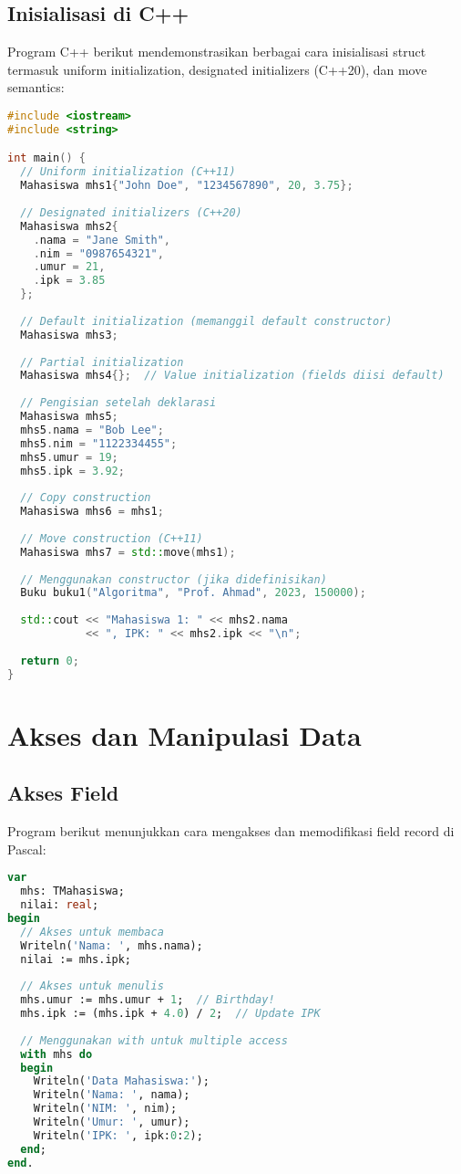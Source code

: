 \documentclass[../main.tex]{subfiles}
\begin{document}
\subsection{Inisialisasi di C++}

Program C++ berikut mendemonstrasikan berbagai cara inisialisasi struct termasuk uniform initialization, designated initializers (C++20), dan move semantics:

\begin{lstlisting}[language=C++, caption={Inisialisasi struct di C++}]
#include <iostream>
#include <string>

int main() {
  // Uniform initialization (C++11)
  Mahasiswa mhs1{"John Doe", "1234567890", 20, 3.75};
  
  // Designated initializers (C++20)
  Mahasiswa mhs2{
    .nama = "Jane Smith",
    .nim = "0987654321",
    .umur = 21,
    .ipk = 3.85
  };
  
  // Default initialization (memanggil default constructor)
  Mahasiswa mhs3;
  
  // Partial initialization
  Mahasiswa mhs4{};  // Value initialization (fields diisi default)
  
  // Pengisian setelah deklarasi
  Mahasiswa mhs5;
  mhs5.nama = "Bob Lee";
  mhs5.nim = "1122334455";
  mhs5.umur = 19;
  mhs5.ipk = 3.92;
  
  // Copy construction
  Mahasiswa mhs6 = mhs1;
  
  // Move construction (C++11)
  Mahasiswa mhs7 = std::move(mhs1);
  
  // Menggunakan constructor (jika didefinisikan)
  Buku buku1("Algoritma", "Prof. Ahmad", 2023, 150000);
  
  std::cout << "Mahasiswa 1: " << mhs2.nama 
            << ", IPK: " << mhs2.ipk << "\n";
  
  return 0;
}
\end{lstlisting}

\section{Akses dan Manipulasi Data}

\subsection{Akses Field}

Program berikut menunjukkan cara mengakses dan memodifikasi field record di Pascal:

\begin{lstlisting}[language=Pascal, caption={Akses field di Pascal}]
var
  mhs: TMahasiswa;
  nilai: real;
begin
  // Akses untuk membaca
  Writeln('Nama: ', mhs.nama);
  nilai := mhs.ipk;
  
  // Akses untuk menulis
  mhs.umur := mhs.umur + 1;  // Birthday!
  mhs.ipk := (mhs.ipk + 4.0) / 2;  // Update IPK
  
  // Menggunakan with untuk multiple access
  with mhs do
  begin
    Writeln('Data Mahasiswa:');
    Writeln('Nama: ', nama);
    Writeln('NIM: ', nim);
    Writeln('Umur: ', umur);
    Writeln('IPK: ', ipk:0:2);
  end;
end.
\end{lstlisting}
\end{document}
